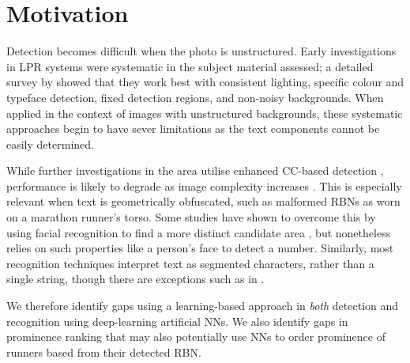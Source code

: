\section{Motivation}
\label{sec:motivation}

Detection becomes difficult when the photo is unstructured. Early investigations in LPR systems were systematic in the subject material assessed; a detailed survey by \cite{Anagnostopoulos:2008vu} showed that they work best  with consistent lighting, specific colour and typeface detection, fixed detection regions, and non-noisy backgrounds. When applied in the context of images with unstructured backgrounds, these systematic approaches begin to have sever limitations as the text components cannot be easily determined.

While further investigations in the area utilise enhanced CC-based detection \citep{Chen:2011ul,Shivakumara:2011dl,Epshtein:2010tj}, performance is likely to degrade as image complexity increases \citep{Li:2012wd}. This is especially relevant when text is geometrically obfuscated, such as malformed RBNs as worn on a marathon runner's torso. Some studies have shown to overcome this by using facial recognition to find a more distinct candidate area \citep{Benami:2012jf}, but nonetheless relies on such properties like a person's face to detect a number. Similarly, most recognition techniques interpret text as segmented characters, rather than a single string, though there are exceptions such as in \cite{Zhu:2016ut}.

We therefore identify gaps using a learning-based approach in \emph{both} detection and recognition using deep-learning artificial NNs. We also identify gaps in prominence ranking that may also potentially use NNs to order prominence of runners based from their detected RBN.



